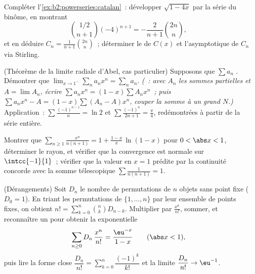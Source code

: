 \begin{exercise}[$\star\star\star$]\label{exo:b2:powerseries:8}
Compléter l'\cref{ex:b2:powerseries:catalan}~: développer $\sqrt{1 - 4x}$
par la série du binôme, en montrant
\[
\binom{1/2}{n+1}(-4)^{n+1} = -\frac{2}{n+1}\binom{2n}{n},
\]
et en déduire $C_n = \frac{1}{n+1}\binom{2n}{n}$~; déterminer le  de $C(x)$ et l'asymptotique de $C_n$ via
Stirling.
\end{exercise}

\begin{exercise}[$\star\star\star$]\label{exo:b2:powerseries:9}
(Théorème de la limite radiale d'Abel, cas particulier) Supposons que $\sum a_n$
. Démontrer que $\lim_{x \to 1^-} \sum_{n} a_n x^n = \sum_n
a_n$. \emph{(~: avec $A_n$ les sommes partielles et $A =
\lim A_n$, écrire $\sum a_nx^n = (1 - x)\sum A_n x^n$~; puis $\sum
a_nx^n - A = (1-x)\sum (A_n - A)x^n$, couper la somme à un grand
$N$.)} Application~: $\sum \frac{(-1)^{n-1}}{n} = \ln 2$ et $\sum
\frac{(-1)^n}{2n+1} = \frac\pi4$, redémontrées à partir de la série
entière.
\end{exercise}

\begin{exercise}[$\star$]\label{exo:b2:powerseries:10}
Montrer que $\displaystyle\sum_{n\geq1}\frac{x^n}{n(n+1)} = 1 +
\frac{1-x}{x}\,\ln(1-x)$ pour $0 < \abs x < 1$, déterminer le
rayon, et vérifier que la convergence est normale sur
$\intcc{-1}{1}$~; vérifier que la valeur en $x = 1$ prédite par
la continuité concorde avec la somme télescopique $\sum
\frac{1}{n(n+1)} = 1$.
\end{exercise}

\begin{exercise}[$\star\star$]\label{exo:b2:powerseries:11}
(Dérangements) Soit $D_n$ le nombre de permutations de $n$
objets sans point fixe ($D_0 = 1$). En triant les
permutations de $\{1, \dots, n\}$ par leur ensemble de points fixes,
on obtient $n! = \sum_{k=0}^{n}\binom nk D_{n-k}$. Multiplier par
$\frac{x^n}{n!}$, sommer, et reconnaître un  pour obtenir
la  exponentielle
\[
\sum_{n\geq0} D_n\,\frac{x^n}{n!} = \frac{\eu^{-x}}{1-x}
\qquad (\abs x < 1),
\]
puis lire la forme close $\dfrac{D_n}{n!} =
\sum_{k=0}^{n}\dfrac{(-1)^k}{k!}$ et la limite $\dfrac{D_n}{n!}
\to \eu^{-1}$.
\end{exercise}

